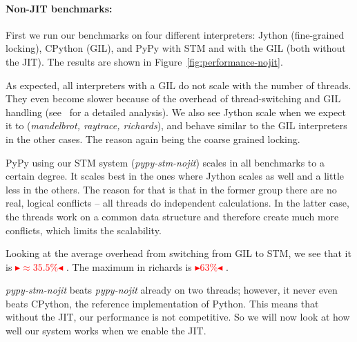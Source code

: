 \documentclass{sigplanconf}
\newcommand{\mynote}[2]{%
  \textcolor{red}{%
    \fbox{\bfseries\sffamily\scriptsize#1}%
    {\small$\blacktriangleright$\textsf{\emph{#2}}$\blacktriangleleft$}%
  }%
}
\newcommand\remi[1]{\mynote{Remi}{#1}}
\begin{document}

\paragraph{Non-JIT benchmarks:} First we run our benchmarks on four
different interpreters: Jython (fine-grained locking), CPython (GIL),
and PyPy with STM and with the GIL (both without the JIT). The results
are shown in Figure~\ref{fig:performance-nojit}.

As expected, all interpreters with a GIL do not scale with the number
of threads. They even become slower because of the overhead of
thread-switching and GIL handling (see~\cite{beazley10} for a detailed
analysis). We also see Jython scale when we expect it to (\emph{mandelbrot,
raytrace, richards}), and behave similar to the GIL interpreters in the
other cases. The reason again being the coarse grained locking.

PyPy using our STM system (\emph{pypy-stm-nojit}) scales in all
benchmarks to a certain degree. It scales best in the ones where
Jython scales as well and a little less in the others. The reason
for that is that in the former group there are no real, logical
conflicts -- all threads do independent calculations. In the latter
case, the threads work on a common data structure and therefore
create much more conflicts, which limits the scalability.

Looking at the average overhead from switching from GIL to STM, we see
that it is \remi{$\approx 35.5\%$}. The maximum in richards is
\remi{$63\%$}.

\emph{pypy-stm-nojit} beats \emph{pypy-nojit} already on two threads;
however, it never even beats CPython, the reference implementation of
Python. This means that without the JIT, our performance is not
competitive. So we will now look at how well our system works when we
enable the JIT.
\end{document}
